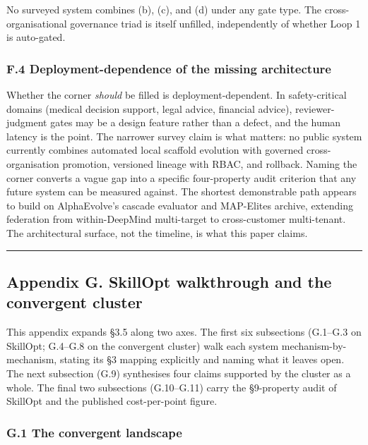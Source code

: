 No surveyed system combines (b), (c), and (d) under any gate type. The
cross-organisational governance triad is itself unfilled, independently
of whether Loop 1 is auto-gated.

\subsubsection{F.4 Deployment-dependence of the missing
architecture}\label{f.4-deployment-dependence-of-the-missing-architecture}

Whether the corner \emph{should} be filled is deployment-dependent. In
safety-critical domains (medical decision support, legal advice,
financial advice), reviewer-judgment gates may be a design feature
rather than a defect, and the human latency is the point. The narrower
survey claim is what matters: no public system currently combines
automated local scaffold evolution with governed cross-organisation
promotion, versioned lineage with RBAC, and rollback. Naming the corner
converts a vague gap into a specific four-property audit criterion that
any future system can be measured against. The shortest demonstrable
path appears to build on AlphaEvolve's cascade evaluator and MAP-Elites
archive, extending federation from within-DeepMind multi-target to
cross-customer multi-tenant. The architectural surface, not the
timeline, is what this paper claims.

\begin{center}\rule{0.5\linewidth}{0.5pt}\end{center}

\subsection{Appendix G. SkillOpt walkthrough and the convergent
cluster}\label{appendix-g.-skillopt-walkthrough-and-the-convergent-cluster}

This appendix expands §3.5 along two axes. The first six subsections
(G.1--G.3 on SkillOpt; G.4--G.8 on the convergent cluster) walk each
system mechanism-by-mechanism, stating its §3 mapping explicitly and
naming what it leaves open. The next subsection (G.9) synthesises four
claims supported by the cluster as a whole. The final two subsections
(G.10--G.11) carry the §9-property audit of SkillOpt and the published
cost-per-point figure.

\subsubsection{G.1 The convergent
landscape}\label{g.1-the-convergent-landscape}


